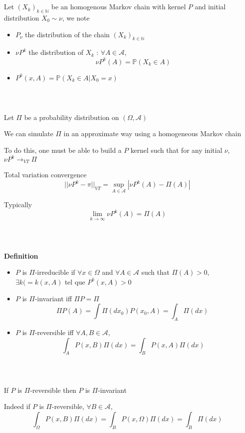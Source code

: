 \documentclass[notes,professionalfont,11pt,usenames,dvipsnames]{beamer}
\renewcommand{\mathcal}{\mathscr}
\newcommand{\ds}{\displaystyle}
\newcommand{\vs}{\bigskip}
\renewcommand{\mathcal}{\mathscr}
\renewcommand{\P}{\mathbb{P}}
\newcommand\justify{\rightskip0pt \leftskip0pt}
\newenvironment{slide}
{\begin{frame}[environment=slide]
\frametitle{\insertsection \\ \insertsubsection}\justify\setlength{\parskip}{0.5cm}\vspace{-0.5cm}}
{\end{frame}}
\begin{document}
\begin{slide}

Let $(X_k)_{k\in\mathbb{N}}$ be an homogenous Markov chain with kernel $P$ 
and initial distribution $X_0\sim\nu$, we note
\begin{itemize}
\item $P_\nu$ the distribution of the chain $(X_k)_{k\in\mathbb{N}}$ 
\item $\nu P^k$ the distribution of $X_k$ : $\forall A\in\mathcal{A}$,
$$
\nu P^k(A)=\P(X_k\in A)
$$
\item $\ds P^k(x,A)=\P(X_k\in A|X_0=x)$
\end{itemize}

\end{slide}

\begin{slide}

Let $\Pi$ be a probability distribution on $(\Omega,\mathcal{A})$


We can simulate $\Pi$ in an approximate way using a homogeneous Markov chain


To do this, one must be able to build a $P$ kernel such that
for any initial $\nu$, $\nu P^k\longrightarrow_{VT} \Pi$


Total variation convergence
$$
||\nu P^k-\pi||_{VT}=\sup_{A\in\mathcal{A}}|\nu P^k(A)-\Pi(A)|
$$


Typically 
$$
\lim_{k\longrightarrow \infty} \nu P^k(A)=\Pi(A)
$$

\end{slide}

\begin{slide}

{\bf Definition}
\begin{itemize}
\vspace{-0.5cm} \item $P$ is $\Pi$-irreducible if $\forall x\in\Omega$ and $\forall A\in\mathcal{A}$
such that $\Pi(A)>0$, $\exists k(=k(x,A)$ tel que $P^k(x,A)>0$

\vs \item $P$ is $\Pi$-invariant iff $\Pi P=\Pi$ 
$$
\Pi P(A)=\int \Pi(dx_0)P(x_0,A)=\int_A \Pi(dx)\
$$ 

\vs \item $P$ is $\Pi$-reversible iff $\forall A,B \in\mathcal{A}$,
$$
\int_A P(x,B)\Pi(dx)=\int_B P(x,A)\Pi(dx)
$$
\end{itemize}

\end{slide}

\begin{slide}

If $P$ is $\Pi$-reversible then $P$ is $\Pi$-invariant


Indeed if $P$ is $\Pi$-reversible, $\forall B\in\mathcal{A}$,
$$
\int_\Omega P(x,B)\Pi(dx)=\int_B P(x,\Omega)\Pi(dx)=\int_B \Pi(dx)
$$

\end{slide}
\end{document}
